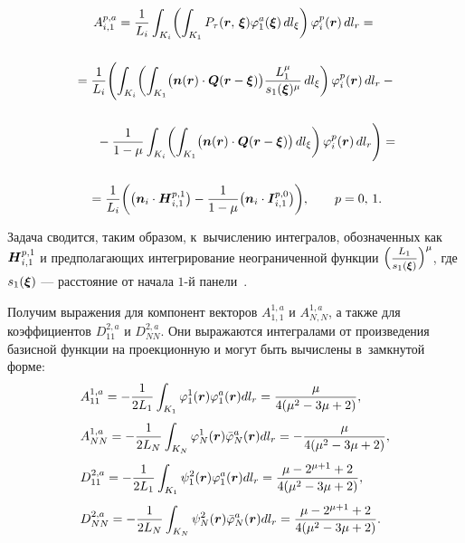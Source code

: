 \documentclass[12pt, a4paper]{article}
\renewcommand{\vec}[1]{\text{\mathversion{bold}${#1}$}}%
\begin{document}
\begin{multline}
\label{longIntegral}
A_{i,1}^{p,a} =\frac{1}{L_i}\int _{K_{i} }\biggl(\int_{K_{1} }P_\tau(\vec{r},\, \vec{\xi })\varphi_1^{a} (\vec{\xi })\, dl_{\xi }  \biggr) \, \varphi _{i}^{p} (\vec{r})\, dl_{r} = {}\\[5mm]
{}=\frac{1}{L_i} \Biggl( \int _{K_{i} }\biggl(\int_{K_{1} } \bigl(\vec n(\vec r) \cdot \vec Q(\vec{r}- \vec{\xi })\bigr) \frac{L_1^\mu}{s_1(\vec \xi)^\mu}\, dl_{\xi }  \biggr) \, \varphi _{i}^{p} (\vec{r})\, dl_{r} - {}\\[5mm]
{} \qquad {} 
- \frac{1}{1-\mu} \int _{K_{i} }\biggl(\int_{K_{1} } \bigl(\vec n(\vec r) \cdot \vec Q(\vec{r}- \vec{\xi })\bigr)\, dl_{\xi }  \biggr) \, \varphi _{i}^{p} (\vec{r})\, dl_{r} \Biggr) = {}\\[5mm]
{} = \frac{1}{L_i} \biggl( \bigl(\vec n_i \cdot \vec H_{i,1}^{p,1}\bigr) - \frac{1}{1-\mu} \bigl(\vec n_i \cdot \vec I_{i,1}^{p,0}\bigr) \biggr), \qquad p=0,\,1.
\end{multline}

Задача сводится, таким образом, к~вычислению интегралов, обозначенных как $\vec H_{i,1}^{p,1}$ и предполагающих интегрирование неограниченной функции $\Bigl(\sfrac{L_1}{s_1(\vec \xi)}\Bigr)^{\mu}$, где $s_1(\vec \xi)$ --- расстояние от начала $1$-й панели~\cite{Marchevskii}.

Получим выражения для компонент векторов $A_{1,1}^{1,a}$ и $A_{N,N}^{1,a}$, а также для коэффициентов $D_{11}^{2,a}$ и $D_{NN}^{2,a}$.
Они выражаются интегралами от произведения базисной функции на проекционную и могут быть вычислены в~замкнутой форме:
\[
\begin{array}{@{}l@{}}
\displaystyle A_{11}^{1,a} = -\frac{1}{2L_1} \int_{K_1} \varphi_1^1(\vec r)\varphi_1^a(\vec r) dl_r = \frac{\mu}{4(\mu^2 - 3\mu + 2)},\\[5mm]
\displaystyle A_{NN}^{1,a} = -\frac{1}{2L_N} \int_{K_N} \varphi_N^1(\vec r)\bar\varphi_N^a(\vec r) dl_r =- \frac{\mu}{4(\mu^2 - 3\mu + 2)},\\[5mm]
\displaystyle D_{11}^{2,a} = -\frac{1}{2L_1} \int_{K_1} \psi_1^2(\vec r)\varphi_1^a(\vec r) dl_r = \frac{\mu-2^{\mu+1}+2}{4(\mu^2 - 3\mu + 2)},\\[5mm]
\displaystyle D_{NN}^{2,a} = -\frac{1}{2L_N} \int_{K_N} \psi_N^2(\vec r)\bar\varphi_N^a(\vec r) dl_r =\frac{\mu-2^{\mu+1}+2}{4(\mu^2 - 3\mu + 2)}.
\end{array}
\]
\end{document}
